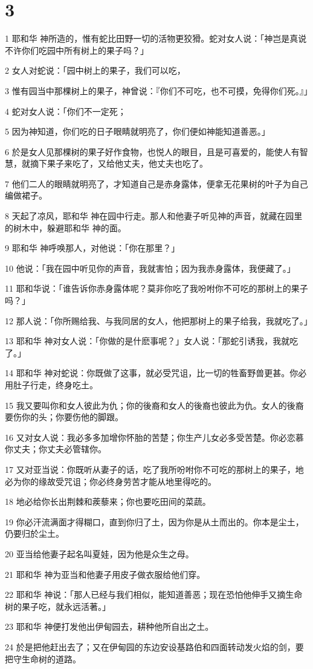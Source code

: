 \chapter{3}

\par 1 耶和华 神所造的，惟有蛇比田野一切的活物更狡猾。蛇对女人说：「神岂是真说不许你们吃园中所有树上的果子吗？」
\par 2 女人对蛇说：「园中树上的果子，我们可以吃，
\par 3 惟有园当中那棵树上的果子，神曾说：『你们不可吃，也不可摸，免得你们死。』」
\par 4 蛇对女人说：「你们不一定死；
\par 5 因为神知道，你们吃的日子眼睛就明亮了，你们便如神能知道善恶。」
\par 6 於是女人见那棵树的果子好作食物，也悦人的眼目，且是可喜爱的，能使人有智慧，就摘下果子来吃了，又给他丈夫，他丈夫也吃了。
\par 7 他们二人的眼睛就明亮了，才知道自己是赤身露体，便拿无花果树的叶子为自己编做裙子。
\par 8 天起了凉风，耶和华 神在园中行走。那人和他妻子听见神的声音，就藏在园里的树木中，躲避耶和华 神的面。
\par 9 耶和华 神呼唤那人，对他说：「你在那里？」
\par 10 他说：「我在园中听见你的声音，我就害怕；因为我赤身露体，我便藏了。」
\par 11 耶和华说：「谁告诉你赤身露体呢？莫非你吃了我吩咐你不可吃的那树上的果子吗？」
\par 12 那人说：「你所赐给我、与我同居的女人，他把那树上的果子给我，我就吃了。」
\par 13 耶和华 神对女人说：「你做的是什麽事呢？」女人说：「那蛇引诱我，我就吃了。」
\par 14 耶和华 神对蛇说：你既做了这事，就必受咒诅，比一切的牲畜野兽更甚。你必用肚子行走，终身吃土。
\par 15 我又要叫你和女人彼此为仇；你的後裔和女人的後裔也彼此为仇。女人的後裔要伤你的头；你要伤他的脚跟。
\par 16 又对女人说：我必多多加增你怀胎的苦楚；你生产儿女必多受苦楚。你必恋慕你丈夫；你丈夫必管辖你。
\par 17 又对亚当说：你既听从妻子的话，吃了我所吩咐你不可吃的那树上的果子，地必为你的缘故受咒诅；你必终身劳苦才能从地里得吃的。
\par 18 地必给你长出荆棘和蒺藜来；你也要吃田间的菜蔬。
\par 19 你必汗流满面才得糊口，直到你归了土，因为你是从土而出的。你本是尘土，仍要归於尘土。
\par 20 亚当给他妻子起名叫夏娃，因为他是众生之母。
\par 21 耶和华 神为亚当和他妻子用皮子做衣服给他们穿。
\par 22 耶和华 神说：「那人已经与我们相似，能知道善恶；现在恐怕他伸手又摘生命树的果子吃，就永远活著。」
\par 23 耶和华 神便打发他出伊甸园去，耕种他所自出之土。
\par 24 於是把他赶出去了；又在伊甸园的东边安设基路伯和四面转动发火焰的剑，要把守生命树的道路。

